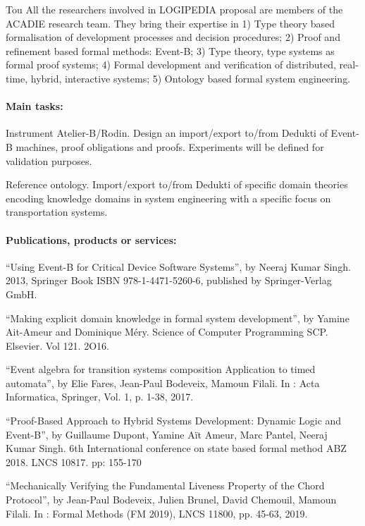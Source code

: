 \begin{sitedescription}{Tou}
 All the researchers involved in LOGIPEDIA proposal are members of the ACADIE research team. They bring their expertise in 1) Type theory based formalisation of development processes and decision procedures; 2) Proof and refinement based formal methods: Event-B; 3) Type theory, type systems as formal proof systems; 4) Formal development and verification of distributed, real-time, hybrid, interactive systems; 5)  Ontology based formal system engineering.


\paragraph*{Main tasks:}

\begin{compactitem}
\item {} Instrument Atelier-B/Rodin. Design an import/export to/from Dedukti of Event-B machines, proof obligations and proofs.  Experiments will be defined for validation purposes. 
\item {} Reference ontology. Import/export to/from Dedukti of specific domain theories encoding knowledge domains in system engineering with a specific focus on transportation systems. 
\end{compactitem}

\paragraph*{Publications, products or services:}

\begin{compactitem}
\item ``Using Event-B for Critical Device Software Systems'', by Neeraj Kumar Singh. 2013, Springer Book ISBN 978-1-4471-5260-6, published by Springer-Verlag GmbH.
\item ``Making explicit domain knowledge in formal system development'', by Yamine Ait-Ameur and Dominique M\'ery. Science of Computer Programming SCP. Elsevier. Vol 121.  2O16.
\item ``Event algebra for transition systems composition Application to timed automata'', by Elie Fares, Jean-Paul Bodeveix, Mamoun Filali. In : Acta Informatica, Springer, Vol. 1, p. 1-38,  2017. 
\item ``Proof-Based Approach to Hybrid Systems Development: Dynamic Logic and Event-B'', by Guillaume Dupont, Yamine Aït Ameur, Marc Pantel, Neeraj Kumar Singh. 6th International conference on state based formal method ABZ 2018. LNCS 10817. pp: 155-170
\item ``Mechanically Verifying the Fundamental Liveness Property of the Chord Protocol'', by Jean-Paul Bodeveix, Julien Brunel, David Chemouil, Mamoun Filali. In : Formal Methods (FM 2019), LNCS  11800, pp. 45-63, 2019.
\end{compactitem}


\end{sitedescription}
